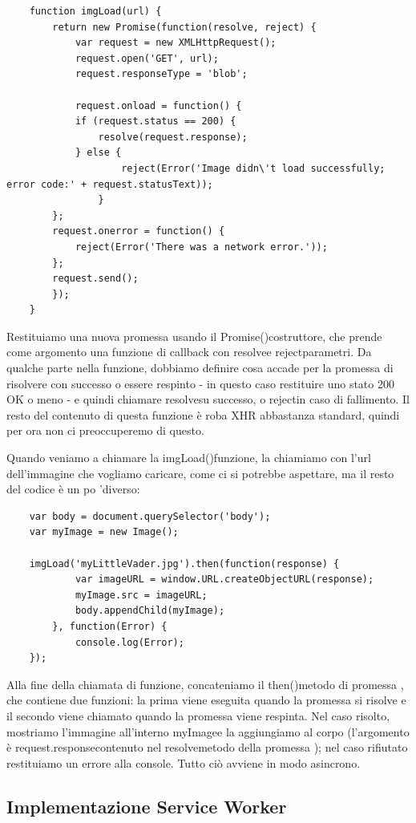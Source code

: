 \documentclass[italian]{article}
\begin{document}
\begin{lstlisting}
	function imgLoad(url) {
		return new Promise(function(resolve, reject) {      
			var request = new XMLHttpRequest();
			request.open('GET', url);
			request.responseType = 'blob';
			
			request.onload = function() {
			if (request.status == 200) {
				resolve(request.response);
			} else {
					reject(Error('Image didn\'t load successfully; error code:' + request.statusText));
				}
		};	
		request.onerror = function() {
			reject(Error('There was a network error.'));
		};	
		request.send();
		});
	}
\end{lstlisting}
Restituiamo una nuova promessa usando il Promise()costruttore, che prende come argomento una funzione di callback con resolvee rejectparametri. Da qualche parte nella funzione, dobbiamo definire cosa accade per la promessa di risolvere con successo o essere respinto - in questo caso restituire uno stato 200 OK o meno - e quindi chiamare resolvesu successo, o rejectin caso di fallimento. Il resto del contenuto di questa funzione è roba XHR abbastanza standard, quindi per ora non ci preoccuperemo di questo.

Quando veniamo a chiamare la imgLoad()funzione, la chiamiamo con l'url dell'immagine che vogliamo caricare, come ci si potrebbe aspettare, ma il resto del codice è un po 'diverso:
\begin{lstlisting}
	var body = document.querySelector('body');
	var myImage = new Image();
	
	imgLoad('myLittleVader.jpg').then(function(response) {
			var imageURL = window.URL.createObjectURL(response);
			myImage.src = imageURL;
			body.appendChild(myImage);
		}, function(Error) {
			console.log(Error);
	});
\end{lstlisting}
Alla fine della chiamata di funzione, concateniamo il then()metodo di promessa , che contiene due funzioni: la prima viene eseguita quando la promessa si risolve e il secondo viene chiamato quando la promessa viene respinta. Nel caso risolto, mostriamo l'immagine all'interno myImagee la aggiungiamo al corpo (l'argomento è request.responsecontenuto nel resolvemetodo della promessa ); nel caso rifiutato restituiamo un errore alla console.
Tutto ciò avviene in modo asincrono.

\subsection{Implementazione Service Worker}
\end{document}
